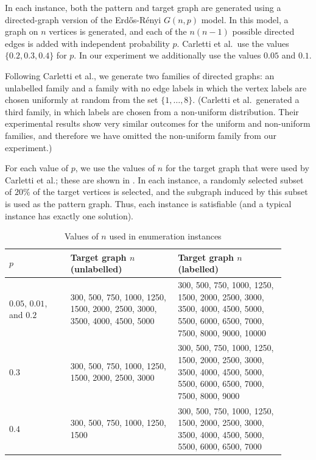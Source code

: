 In each instance, both the pattern and target graph are generated using a directed-graph
version of the Erd\H{o}s-Rényi $G(n,p)$ model.  In this model, a graph on $n$ vertices
is generated, and each of the $n(n-1)$ possible directed edges is added with independent
probability $p$.  Carletti et al.\ use the values $\{0.2, 0.3, 0.4\}$ for $p$. In our experiment
we additionally use the values $0.05$ and $0.1$.

Following Carletti et al., we generate two families of directed graphs: an unlabelled family
and a family with no edge labels in which the vertex labels are chosen uniformly at random
from the set $\{1,\dots,8\}$.  (Carletti et al.\ generated a third family, in which labels
are chosen from a non-uniform distribution.  Their experimental results show very similar
outcomes for the uniform and non-uniform families, and therefore we have omitted the non-uniform
family from our experiment.)

For each value of $p$, we use the values
of $n$ for the target graph that were used by Carletti et al.; these are shown in .
In each instance, a randomly selected subset of $20\%$ of the target vertices is selected,
and the subgraph induced by this subset is used as the pattern graph.  Thus, each instance
is satisfiable (and a typical instance has exactly one solution).

\begin{table}[htb]
\centering
\footnotesize
 \begin{tabular}{p{0.2\linewidth} p{0.35\linewidth} p{0.35\linewidth}}
 \toprule
     $p$ & Target graph $n$ (unlabelled) & Target graph $n$ (labelled) \\ [0.5ex]
 \midrule
     $0.05$, $0.01$, and $0.2$ &
         300, 500, 750, 1000, 1250, 1500, 2000, 2500, 3000, 3500, 4000, 4500, 5000 &
         300, 500, 750, 1000, 1250, 1500, 2000, 2500, 3000, 3500, 4000, 4500, 5000,
         5500, 6000, 6500, 7000, 7500, 8000, 9000, 10000\\
     \rule{0pt}{2.3ex}$0.3$ & 
        300, 500, 750, 1000, 1250, 1500, 2000, 2500, 3000 &
        300, 500, 750, 1000, 1250, 1500, 2000, 2500, 3000, 3500, 4000, 4500, 5000,
        5500, 6000, 6500, 7000, 7500, 8000, 9000 \\
     \rule{0pt}{2.3ex}$0.4$ & 300, 500, 750, 1000, 1250, 1500 &
        300, 500, 750, 1000, 1250, 1500, 2000, 2500, 3000, 3500, 4000, 4500, 5000, 5500, 6000, 6500, 7000 \\
 \bottomrule
\end{tabular}
\caption{Values of $n$ used in enumeration instances}
\label{tab:carletti-n}
\end{table}

